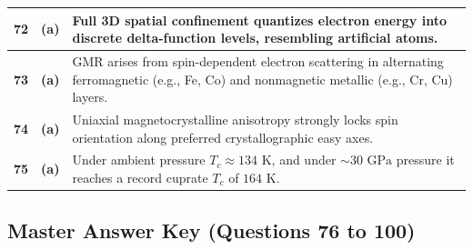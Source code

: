 {\begin{tabularx}{\textwidth}{|c|c|X|}
\textbf{72} & \textbf{(a)} & Full 3D spatial confinement quantizes electron energy into discrete delta-function levels, resembling artificial atoms. \\ \hline
\textbf{73} & \textbf{(a)} & GMR arises from spin-dependent electron scattering in alternating ferromagnetic (e.g., Fe, Co) and nonmagnetic metallic (e.g., Cr, Cu) layers. \\ \hline
\textbf{74} & \textbf{(a)} & Uniaxial magnetocrystalline anisotropy strongly locks spin orientation along preferred crystallographic easy axes. \\ \hline
\textbf{75} & \textbf{(a)} & Under ambient pressure $T_c \approx 134\text{ K}$, and under $\sim 30\text{ GPa}$ pressure it reaches a record cuprate $T_c$ of $164\text{ K}$. \\ \hline
\end{tabularx}
}

\newpage

\subsection*{Master Answer Key (Questions 76 to 100)}

